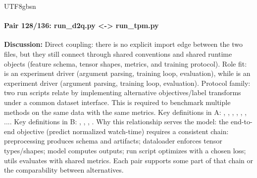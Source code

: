 \documentclass[11pt]{article}
\begin{document}
\begin{CJK*}{UTF8}{gbsn}
\paragraph{Pair 128/136: run\_d2q.py <-> run\_tpm.py}
\textbf{Discussion:} Direct coupling: there is no explicit import edge between the two files, but they still connect through shared conventions and shared runtime objects (feature schema, tensor shapes, metrics, and training protocol). Role fit: \texttt{} is an experiment driver (argument parsing, training loop, evaluation), while \texttt{} is an experiment driver (argument parsing, training loop, evaluation). Protocol family: two run scripts relate by implementing alternative objectives/label transforms under a common dataset interface. This is required to benchmark multiple methods on the same data with the same metrics. Key definitions in A: \texttt{}, \texttt{}, \texttt{}, \texttt{}, \texttt{}, \texttt{}, .... Key definitions in B: \texttt{}, \texttt{}, \texttt{}, \texttt{}. Why this relationship serves the model: the end-to-end objective (predict normalized watch-time) requires a consistent chain: preprocessing produces schema and artifacts; dataloader enforces tensor types/shapes; model computes outputs; run script optimizes with a chosen loss; utils evaluates with shared metrics. Each pair supports some part of that chain or the comparability between alternatives.


\end{CJK*}
\end{document}
